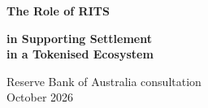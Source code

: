 \documentclass[aspectratio=169,12pt]{beamer}
\begin{document}
\raggedright

\iftrue %




{
\begin{frame}[plain]\vfill\centering
{\color{White}\displayfont\fontsize{25.5}{30.4}\selectfont\bfseries The Role of RITS\par}
\vspace{0.10cm}
{\color{White}\displayfont\fontsize{18.5}{24.4}\selectfont\bfseries
 in Supporting Settlement\\
 in a Tokenised Ecosystem\par}
\vspace{0.85cm}
{\color{Mist}\fontsize{11}{15}\selectfont
 Reserve Bank of Australia consultation\\[.15cm]
 October 2026\par}
\vfill
\end{frame}}
\end{document}
